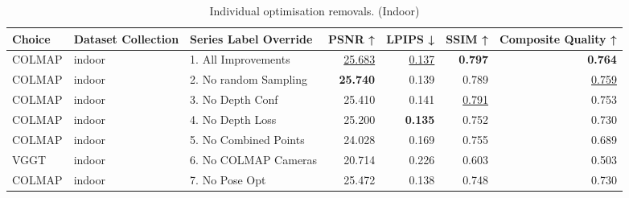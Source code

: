 \begin{table}[H]
\caption{\ifdefined\customcaption \customcaption \else Individual optimisation removals. (Indoor) \fi}
\label{tab:99_all_improvements_removals_indoor}
\centering
\scriptsize
\begin{tabular}{lllrrrr}
\toprule
Choice & Dataset Collection & Series Label Override & PSNR ↑ & LPIPS ↓ & SSIM ↑ & Composite Quality ↑ \\
\midrule
COLMAP & indoor & 1. All Improvements & \underline{25.683} & \underline{0.137} & \textbf{0.797} & \textbf{0.764} \\
COLMAP & indoor & 2. No random Sampling & \textbf{25.740} & 0.139 & 0.789 & \underline{0.759} \\
COLMAP & indoor & 3. No Depth Conf & 25.410 & 0.141 & \underline{0.791} & 0.753 \\
COLMAP & indoor & 4. No Depth Loss & 25.200 & \textbf{0.135} & 0.752 & 0.730 \\
COLMAP & indoor & 5. No Combined Points & 24.028 & 0.169 & 0.755 & 0.689 \\
VGGT & indoor & 6. No COLMAP Cameras & 20.714 & 0.226 & 0.603 & 0.503 \\
COLMAP & indoor & 7. No Pose Opt & 25.472 & 0.138 & 0.748 & 0.730 \\
\bottomrule
\end{tabular}
\end{table}